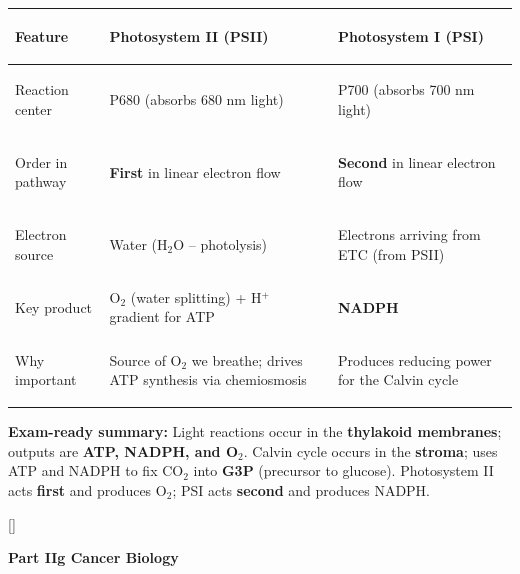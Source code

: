 \documentclass[11pt, letterpaper]{article}
\newcommand{\bluesections}{%
  \titleformat{\section}{\large\bfseries\color{sectionblue}}{}{0em}{}[\color{sectionblue}\titlerule]%
  \titleformat{\subsection}{\normalsize\bfseries\color{sectionblue!80!black}}{}{0em}{}%
}
\newcommand{\partbanner}[3]{%
  \begin{tcolorbox}[colback=#1, colframe=#2, boxrule=1.2pt, arc=4pt,
    left=8pt, right=8pt, top=6pt, bottom=6pt]
    \begin{center}{\LARGE\bfseries #3}\end{center}
  \end{tcolorbox}%
}
\begin{document}
\noindent
{\renewcommand{\arraystretch}{1.5}
\begin{tabularx}{\textwidth}{>{\bfseries\raggedright\arraybackslash}p{3.5cm}>{\raggedright\arraybackslash}X>{\raggedright\arraybackslash}X}
\toprule
\rowcolor{tableheadergreen}
\textbf{Feature} & \textbf{Photosystem II (PSII)} & \textbf{Photosystem I (PSI)} \\
\midrule
\rowcolor{rowBg} Reaction center & P680 (absorbs 680 nm light) & P700 (absorbs 700 nm light) \\
\rowcolor{rowA}  Order in pathway & \textbf{First} in linear electron flow & \textbf{Second} in linear electron flow \\
\rowcolor{rowBg} Electron source & Water (H$_2$O -- photolysis) & Electrons arriving from ETC (from PSII) \\
\rowcolor{rowA}  Key product & O$_2$ (water splitting) + H$^+$ gradient for ATP & \textbf{NADPH} \\
\rowcolor{rowBg} Why important & Source of O$_2$ we breathe; drives ATP synthesis via chemiosmosis & Produces reducing power for the Calvin cycle \\
\bottomrule
\end{tabularx}}

\vspace{4pt}
\begin{tcolorbox}[colback=part2bg, colframe=sectiongreen, arc=3pt, boxrule=1pt]
\textbf{Exam-ready summary:} Light reactions occur in the \textbf{thylakoid membranes}; outputs are \textbf{ATP, NADPH, and O$_2$}. Calvin cycle occurs in the \textbf{stroma}; uses ATP and NADPH to fix CO$_2$ into \textbf{G3P} (precursor to glucose). Photosystem II acts \textbf{first} and produces O$_2$; PSI acts \textbf{second} and produces NADPH.
\end{tcolorbox}

\newpage



\newpage

\bluesections
{}
\partbanner{partbg}{sectionblue}{Part IIg \quad Cancer Biology}
\end{document}
